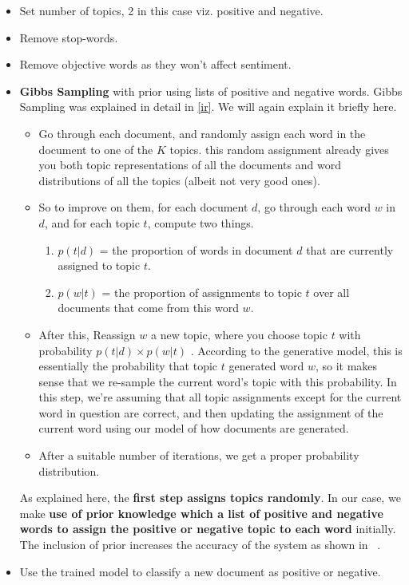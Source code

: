 \begin{itemize}
 \item Set number of topics, 2 in this case viz. positive and negative.
 \item Remove stop-words.
 \item Remove objective words as they won't affect sentiment.
 \item \textbf{Gibbs Sampling} with prior using lists of positive and negative words.
  Gibbs Sampling was explained in detail in \cref{ir}. We will again explain it briefly here.
  \begin{itemize}
   \item Go through each document, and randomly assign each word in the document to one of the \(K\) topics. this random assignment already gives you both topic 
   representations of all the documents and word distributions of all the topics (albeit not very good ones). 
   \item So to improve on them, for each document \(d\), go through each word \(w\) in \(d\), and for each topic \(t\), compute two things.
   \begin{enumerate}
    \item \(p(t|d)\) = the proportion of words in document \(d\) that are currently assigned to topic \(t\).
    \item \(p(w|t)\) = the proportion of assignments to topic \(t\) over all documents that come from this word \(w\). 
   \end{enumerate}
   \item After this, Reassign \(w\) a new topic, where you choose topic \(t\) with probability \(p(t|d) \times p(w|t)\) . According to the generative model, this is 
   essentially the probability that topic \(t\) generated word \(w\), so it makes sense that we re-sample the current word's topic with this probability. In this step,
   we're assuming that all topic assignments except for the current word in question are correct, and then updating the assignment of the current word using our model 
   of how documents are generated.
   \item After a suitable number of iterations, we get a proper probability distribution.
  \end{itemize}
  As explained here, the \textbf{first step assigns topics randomly}. In our case, we make \textbf{use of prior knowledge which a list of positive and negative words
  to assign the positive or negative topic to each word} initially. The inclusion of prior increases the accuracy of the system as shown in ~.
 \item Use the trained model to classify a new document as positive or negative.
\end{itemize}

